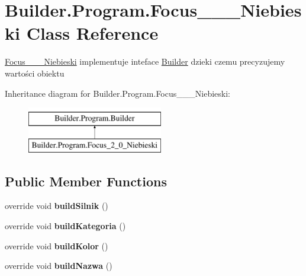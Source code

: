 \hypertarget{class_builder_1_1_program_1_1_focus__2__0___niebieski}{}\section{Builder.\+Program.\+Focus\+\_\+\_\+\_\+\+Niebieski Class Reference}
\label{class_builder_1_1_program_1_1_focus__2__0___niebieski}


\hyperlink{class_builder_1_1_program_1_1_focus__2__0___niebieski}{Focus\+\_\+\_\+\_\+\+Niebieski} implementuje inteface \hyperlink{class_builder_1_1_program_1_1_builder}{Builder} dzieki czemu precyzujemy wartości obiektu  


Inheritance diagram for Builder.\+Program.\+Focus\+\_\+\_\+\_\+\+Niebieski\+:\begin{figure}[H]
\begin{center}
\leavevmode
\includegraphics[height=2.000000cm]{class_builder_1_1_program_1_1_focus__2__0___niebieski}
\end{center}
\end{figure}
\subsection*{Public Member Functions}
\begin{DoxyCompactItemize}
\item 
\mbox{\label{class_builder_1_1_program_1_1_focus__2__0___niebieski_aa65fca28aadf7ca55a89a6d07bc067b2}} 
override void {\bfseries build\+Silnik} ()
\item 
\mbox{\label{class_builder_1_1_program_1_1_focus__2__0___niebieski_af9bf66e45cd2b1d649dd1bb7c969729a}} 
override void {\bfseries build\+Kategoria} ()
\item 
\mbox{\label{class_builder_1_1_program_1_1_focus__2__0___niebieski_a23eaa690b38376d674d5d6c419403257}} 
override void {\bfseries build\+Kolor} ()
\item 
\mbox{\label{class_builder_1_1_program_1_1_focus__2__0___niebieski_a53d0f8e360205daf15b50a3d84b48b4b}} 
override void {\bfseries build\+Nazwa} ()
\end{DoxyCompactItemize}
